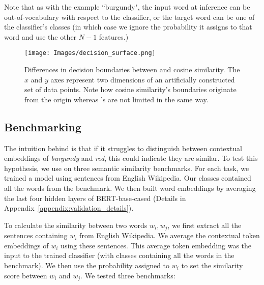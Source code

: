 Note that as with the example ``burgundy",  the input word at inference can be out-of-vocabulary with respect to the classifier, or the target word can be one of the classifier's classes (in which case we ignore the probability it assigns to that word and use the other $N-1$ features.)

 


\label{sec:cosine_vs_probe}
\begin{figure*}[h!]
    \centering
    \texttt{[image: Images/decision\_surface.png]}
    \caption{Differences in decision boundaries between \wc and cosine similarity. The $x$ and $y$ axes represent two dimensions of an artificially constructed set of data points. Note how cosine similarity's boundaries originate from the origin whereas {\wc}'s are not limited in the same way.}
    \label{fig_concept_prob_boundaries}
\end{figure*}

\subsection{Benchmarking \wc}
\label{sec:initial_eval}

The intuition behind \wc is that if it struggles to distinguish between contextual embeddings of \textit{burgundy} and \textit{red}, this could indicate they are similar. To test this hypothesis, we use \wc on three semantic similarity benchmarks. For each task, we trained a model using sentences from English Wikipedia. Our classes contained all the words from the benchmark. We then built word embeddings by averaging the last four hidden layers of BERT-base-cased (Details in Appendix~\ref{appendix:validation_details}). 

To calculate the similarity between two words $w_i, w_j$, we first extract all the sentences containing $w_i$ from English Wikipedia. We average the contextual token embeddings of $w_i$ using these sentences. This average token embedding was the input to the trained classifier (with classes containing all the words in the benchmark). We then use the probability \wc assigned to $w_i$  to set the similarity score between $w_i$ and $w_j$. We tested three benchmarks:

